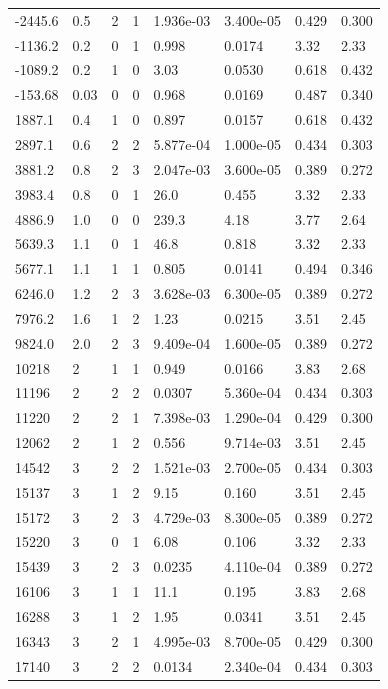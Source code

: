 \documentclass[preview]{standalone}
\begin{document}
{{\begin{tabular}{L{1.2cm}C{1.2cm} C{0.3cm}C{0.5cm} C{1.4cm}C{1.4cm} C{1.4cm}C{1.4cm}}
  -2445.6  &   0.5  & 2     &  1 &  1.936e-03  & 3.400e-05  & 0.429 &  0.300   \\ 
  -1136.2  &   0.2  & 0     &  1 &  0.998  & 0.0174  & 3.32 &  2.33   \\ 
  -1089.2  &   0.2  & 1     &  0 &  3.03  & 0.0530  & 0.618 &  0.432   \\ 
  -153.68  &  0.03  & 0     &  0 &  0.968  & 0.0169  & 0.487 &  0.340   \\ 
  1887.1  &   0.4  & 1     &  0 &  0.897  & 0.0157  & 0.618 &  0.432   \\ 
  2897.1  &   0.6  & 2     &  2 &  5.877e-04  & 1.000e-05  & 0.434 &  0.303   \\ 
  3881.2  &   0.8  & 2     &  3 &  2.047e-03  & 3.600e-05  & 0.389 &  0.272   \\ 
  3983.4  &   0.8  & 0     &  1 &  26.0  & 0.455  & 3.32 &  2.33   \\ 
  4886.9  &   1.0  & 0     &  0 &  239.3  & 4.18  & 3.77 &  2.64   \\ 
  5639.3  &   1.1  & 0     &  1 &  46.8  & 0.818  & 3.32 &  2.33   \\ 
  5677.1  &   1.1  & 1     &  1 &  0.805  & 0.0141  & 0.494 &  0.346   \\ 
  6246.0  &   1.2  & 2     &  3 &  3.628e-03  & 6.300e-05  & 0.389 &  0.272   \\ 
  7976.2  &   1.6  & 1     &  2 &  1.23  & 0.0215  & 3.51 &  2.45   \\ 
  9824.0  &   2.0  & 2     &  3 &  9.409e-04  & 1.600e-05  & 0.389 &  0.272   \\ 
  10218  &     2  & 1     &  1 &  0.949  & 0.0166  & 3.83 &  2.68   \\ 
  11196  &     2  & 2     &  2 &  0.0307  & 5.360e-04  & 0.434 &  0.303   \\ 
  11220  &     2  & 2     &  1 &  7.398e-03  & 1.290e-04  & 0.429 &  0.300   \\ 
  12062  &     2  & 1     &  2 &  0.556  & 9.714e-03  & 3.51 &  2.45   \\ 
  14542  &     3  & 2     &  2 &  1.521e-03  & 2.700e-05  & 0.434 &  0.303   \\ 
  15137  &     3  & 1     &  2 &  9.15  & 0.160  & 3.51 &  2.45   \\ 
  15172  &     3  & 2     &  3 &  4.729e-03  & 8.300e-05  & 0.389 &  0.272   \\ 
  15220  &     3  & 0     &  1 &  6.08  & 0.106  & 3.32 &  2.33   \\ 
  15439  &     3  & 2     &  3 &  0.0235  & 4.110e-04  & 0.389 &  0.272   \\ 
  16106  &     3  & 1     &  1 &  11.1  & 0.195  & 3.83 &  2.68   \\ 
  16288  &     3  & 1     &  2 &  1.95  & 0.0341  & 3.51 &  2.45   \\ 
  16343  &     3  & 2     &  1 &  4.995e-03  & 8.700e-05  & 0.429 &  0.300   \\ 
  17140  &     3  & 2     &  2 &  0.0134  & 2.340e-04  & 0.434 &  0.303   \\ 
\hline 
\end{tabular} 

}}
\end{document}
